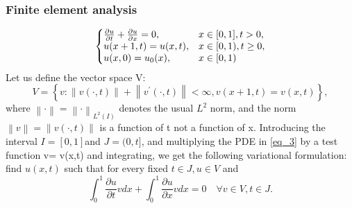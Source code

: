 \documentclass[a4paper,10pt,twoside]{article}
\begin{document}

\subsubsection{Finite element analysis}
\begin{equation}
  \left\{
  \begin{array}{@{}ll@{}}
    \frac{\partial u }{\partial t} + \frac{\partial u}{\partial x}= 0, & x \in [0,1], t>0,\\
    u(x+1, t) = u(x, t), & x \in [0,1), t \geq 0,\\
    u(x,0) = u_0(x), & x \in [0,1)
  \end{array}\right.
  \label{eq_3}
\end{equation}
Let us define the vector space V:
\begin{equation}
  V = \left\{  v:\left\| v(\cdot,t) \right\|  + \left\| {  v}^{  '}(\cdot,t) \right\| < \infty, v(x+1, t) = v(x, t) \right\},
  \label{eq_4}
\end{equation}
where $ \left\| \cdot \right\| ={ \left\| \cdot  \right\|  }_{ L^2(I) } $ denotes the usual $L^2$ norm, and the norm $  \left\| v\right\| =  \left\| v( \cdot,t )\right\|$ is a function of t not a function of x. Introducing the interval $I= [0,1] $and $ J= (0,t] $, and multiplying the PDE in \ref{eq_3} by a test function v= v(x,t) and integrating, we get the following variational formulation: 
find $u(x,t)$ such that for every fixed $t \in J, u \in V$ and
\begin{equation}
    \int_0^1 \frac{\partial u}{\partial t}v dx+ \int_0^1 \frac{\partial u}{\partial x}v dx= 0 \quad\forall v \in V, t \in J.
    \label{eq_5}
\end{equation}
\end{document}
